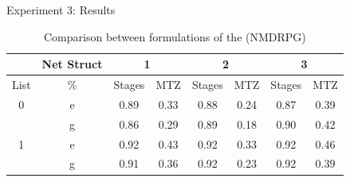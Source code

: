 \documentclass[slidestop,usepdftitle=false,10pt]{beamer}
\begin{document}
	\begin{frame}{Experiment 3: Results}
	    \begin{table}[!h]
        \caption{Comparison between formulations of the (NMDRPG)}
        \centering
        \footnotesize
        \begin{tabular}{c c | c c | c c | c c}
        \hline
         & Net Struct  & \multicolumn{2}{c}{1} &  \multicolumn{2}{c}{2}  & \multicolumn{2}{c}{3}\\
        \hline
        List & $\%$ &  Stages  & MTZ & Stages & MTZ  & Stages & MTZ\\
        \hline
        \multirow{}{}{0} & e & 0.89 & 0.33 & 0.88 & 0.24 & 0.87 & 0.39\\
        & g & 0.86 & 0.29 & 0.89 & 0.18 & 0.90 & 0.42\\
        \hline
        \multirow{}{}{1} & e & 0.92 & 0.43 & 0.92 & 0.33 & 0.92 & 0.46\\
        & g & 0.91 & 0.36 & 0.92 & 0.23 & 0.92 & 0.39\\
        \hline
        \end{tabular}
        \label{table:tab5}
        \end{table}
    
    \begin{table}[!h]
        \caption{Comparison between exact resolution with and without initialization of the (NMDRPG)}
        \centering
        \tiny
        \label{table:tab6}
    \end{table}
	\end{frame}
	
\end{document}
